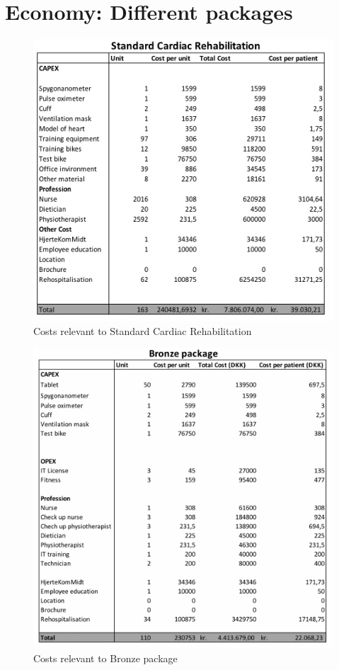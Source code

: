 \chapter{Economy: Different packages} \label{economics} \label{packages}

\begin{figure}[H]
\centering
\includegraphics[width=1\textwidth]{Figure/SCR.png}
\caption{Costs relevant to Standard Cardiac Rehabilitation}
\label{fig: SCR}
\end{figure} 

\begin{figure}[H]
\centering
\includegraphics[width=1\textwidth]{Figure/Bronze.png}
\caption{Costs relevant to Bronze package}
\label{fig: Bronze}
\end{figure} 

